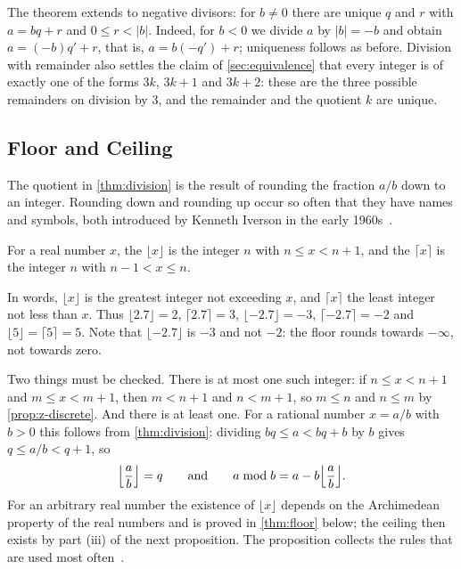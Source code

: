 The theorem extends to negative divisors: for $b\ne0$ there are unique $q$ and $r$ with $a=bq+r$ and $0\le r<|b|$. Indeed, for $b<0$ we divide $a$ by $|b|=-b$ and obtain $a=(-b)q'+r$, that is, $a=b(-q')+r$; uniqueness follows as before. Division with remainder also settles the claim of \cref{sec:equivalence} that every integer is of exactly one of the forms $3k$, $3k+1$ and $3k+2$: these are the three possible remainders on division by $3$, and the remainder and the quotient $k$ are unique.

\subsection{Floor and Ceiling}

The quotient in \cref{thm:division} is the result of rounding the fraction $a/b$ down to an integer. Rounding down and rounding up occur so often that they have names and symbols, both introduced by Kenneth Iverson in the early 1960s~\cite[Sect.~3.1]{graham1994concrete}.

\begin{definition}
\label{def:floor}
For a real number $x$, the  $\lfloor x\rfloor$ is the integer $n$ with $n\le x<n+1$, and the  $\lceil x\rceil$ is the integer $n$ with $n-1<x\le n$.
\end{definition}

In words, $\lfloor x\rfloor$ is the greatest integer not exceeding $x$, and $\lceil x\rceil$ the least integer not less than $x$. Thus $\lfloor 2.7\rfloor=2$, $\lceil2.7\rceil=3$, $\lfloor-2.7\rfloor=-3$, $\lceil-2.7\rceil=-2$ and $\lfloor5\rfloor=\lceil5\rceil=5$. Note that $\lfloor-2.7\rfloor$ is $-3$ and not $-2$: the floor rounds towards $-\infty$, not towards zero.

Two things must be checked. There is at most one such integer: if $n\le x<n+1$ and $m\le x<m+1$, then $m<n+1$ and $n<m+1$, so $m\le n$ and $n\le m$ by \cref{prop:z-discrete}. And there is at least one. For a rational number $x=a/b$ with $b>0$ this follows from \cref{thm:division}: dividing $bq\le a<bq+b$ by $b$ gives $q\le a/b<q+1$, so
\begin{equation}
\Bigl\lfloor\frac ab\Bigr\rfloor=q\qquad\text{and}\qquad a\bmod b=a-b\Bigl\lfloor\frac ab\Bigr\rfloor .
\label{eq:mod-floor}
\end{equation}
For an arbitrary real number the existence of $\lfloor x\rfloor$ depends on the Archimedean property of the real numbers and is proved in \cref{thm:floor} below; the ceiling then exists by part (iii) of the next proposition. The proposition collects the rules that are used most often~\cite[Chap.~3]{graham1994concrete}.

